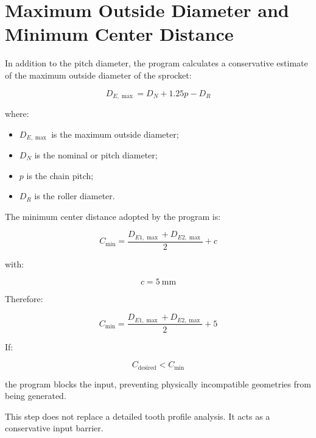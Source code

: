 \documentclass[12pt,a4paper]{article}
\begin{document}
\section{Maximum Outside Diameter and Minimum Center Distance}

In addition to the pitch diameter, the program calculates a conservative estimate of the maximum outside diameter of the sprocket:

\begin{equation}
D_{E,\max}=D_N+1.25p-D_R
\end{equation}

where:

\begin{itemize}
    \item $D_{E,\max}$ is the maximum outside diameter;
    \item $D_N$ is the nominal or pitch diameter;
    \item $p$ is the chain pitch;
    \item $D_R$ is the roller diameter.
\end{itemize}

The minimum center distance adopted by the program is:

\begin{equation}
C_{\min}=
\frac{D_{E1,\max}+D_{E2,\max}}{2}
+
c
\end{equation}

with:

\begin{equation}
c=5\ \mathrm{mm}
\end{equation}

Therefore:

\begin{equation}
C_{\min}=
\frac{D_{E1,\max}+D_{E2,\max}}{2}
+
5
\end{equation}

If:

\begin{equation}
C_{\text{desired}} < C_{\min}
\end{equation}

the program blocks the input, preventing physically incompatible geometries from being generated.

This step does not replace a detailed tooth profile analysis. It acts as a conservative input barrier.

\end{document}
